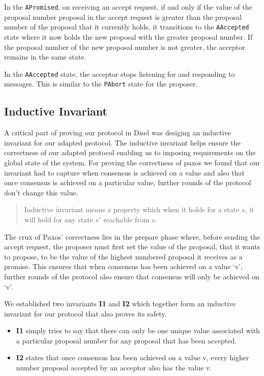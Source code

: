 In the \texttt{APromised}, on receiving an accept request, if and only if
the value of the proposal number proposal in the accept request is greater than
the proposal number of the proposal that it currently holds, it transitions to the
\texttt{AAccepted} state where it now holds the new proposal with the greater
proposal number. If the proposal number of the new proposal number is not greater,
the acceptor remains in the same state.

In the \texttt{AAccepted} state, the acceptor stops listening for and responding
to messages. This is similar to the \texttt{PAbort} state for the proposer.


\subsection{Inductive Invariant}
A critical part of proving our protocol in Disel was desiging an inductive invariant
for our adapted protocol. The inductive invariant helps ensure the correctness of
our adapted protocol enabling us to imposing requirements on the global state of the system.
For proving the correctness of paxos we found that our invariant had to capture
when consensus is achieved on a value and also that once consensus is achieved
on a particular value, further rounds of the protocol don’t change this value.

\begin{quote}
Inductive invariant means a property which when it holds for a state $s$,
it will hold for any state $s'$ reachable from $s$.
\end{quote}

The crux of Paxos' correctness lies in the prepare phase where, before sending
the accept request, the proposer must first set the value of the proposal, that
it wants to propose, to be the value of the highest numbered proposal it receives
as a promise. This ensures that when consensus has been achieved on a value `v',
further rounds of the protocol also ensure that consensus will only be achieved on `v'.

We established two invariants \textbf{I1} and \textbf{I2} which together form an inductive
invariant for our protocol that also proves its safety.

\begin{itemize}
  \item \textbf{I1} simply tries to say that there can only be one unique value
    associated with a particular proposal number for any proposal that has been accepted.
  \item \textbf{I2} states that once consensus has been achieved on a value v,
    every higher number proposal accepted by an acceptor also has the value v.
\end{itemize}

